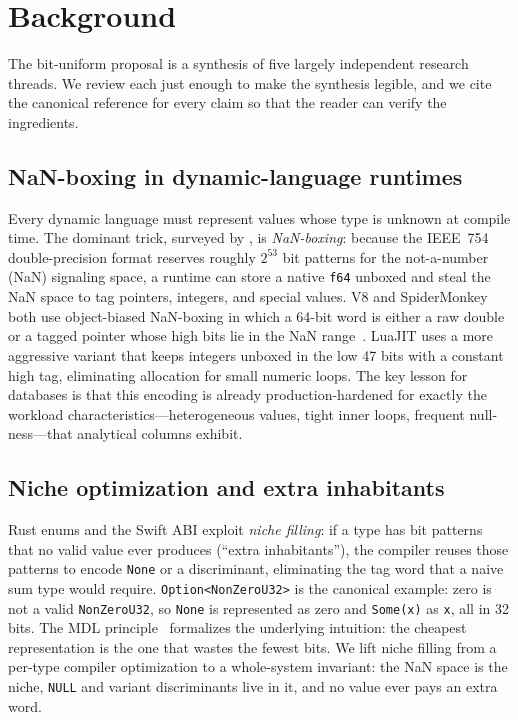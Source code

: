 \documentclass[10pt]{article}
\begin{document}
\section{Background}
\label{sec:bg}

The bit-uniform proposal is a synthesis of five largely independent
research threads. We review each just enough to make the synthesis
legible, and we cite the canonical reference for every claim so that
the reader can verify the ingredients.

\subsection{NaN-boxing in dynamic-language runtimes}
Every dynamic language must represent values whose type is unknown at
compile time. The dominant trick, surveyed by
\citet{wingo2011value}, is \emph{NaN-boxing}: because the IEEE~754
double-precision format reserves roughly $2^{53}$ bit patterns for the
not-a-number (NaN) signaling space, a runtime can store a native
\texttt{f64} unboxed and steal the NaN space to tag pointers, integers,
and special values. V8 and SpiderMonkey both use object-biased
NaN-boxing in which a 64-bit word is either a raw double or a tagged
pointer whose high bits lie in the NaN range~\citep{wingo2011value}.
LuaJIT uses a more aggressive variant that keeps integers unboxed in
the low 47 bits with a constant high tag, eliminating allocation for
small numeric loops. The key lesson for databases is that this encoding
is already production-hardened for exactly the workload
characteristics---heterogeneous values, tight inner loops, frequent
null-ness---that analytical columns exhibit.

\subsection{Niche optimization and extra inhabitants}
Rust enums and the Swift ABI exploit \emph{niche filling}: if a type
has bit patterns that no valid value ever produces (``extra
inhabitants''), the compiler reuses those patterns to encode
\texttt{None} or a discriminant, eliminating the tag word that a naive
sum type would require. \texttt{Option<NonZeroU32>} is the canonical
example: zero is not a valid \texttt{NonZeroU32}, so \texttt{None} is
represented as zero and \texttt{Some(x)} as \texttt{x}, all in 32 bits.
The MDL principle~\citep{grunwald2004mdl} formalizes the underlying
intuition: the cheapest representation is the one that wastes the
fewest bits. We lift niche filling from a per-type compiler
optimization to a whole-system invariant: the NaN space is the niche,
\texttt{NULL} and variant discriminants live in it, and no value ever
pays an extra word.
\end{document}
